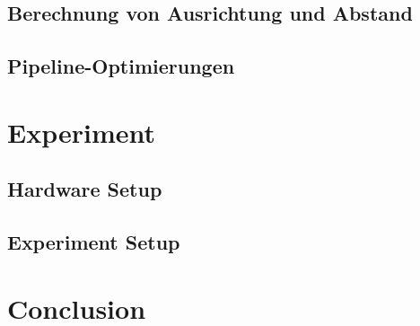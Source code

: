 \documentclass[arbeit=studie,oneside,BCOR=12mm]{ArbeitRST}
\begin{document}
\section{Berechnung von Ausrichtung und Abstand}
\section{Pipeline-Optimierungen}

\chapter{Experiment}
\section{Hardware Setup}
\section{Experiment Setup}


\chapter{Conclusion}
\end{document}
